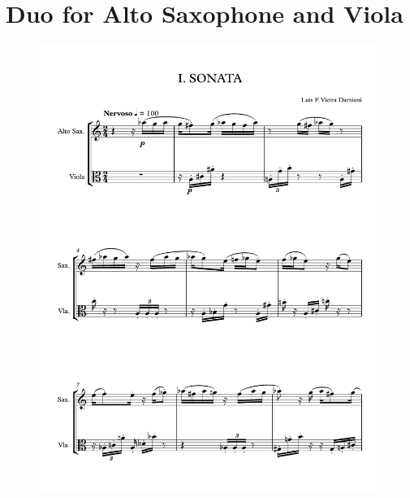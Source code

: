 \chapter{Duo for Alto Saxophone and Viola}

\begin{figure}[h!]
    \centering
	\includegraphics[width=6.5in]{figures/Sax_Viola_1.pdf}
\end{figure}

